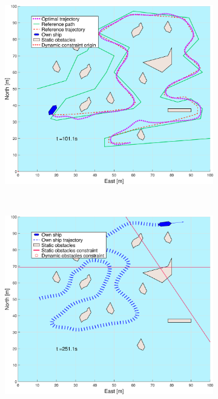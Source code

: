 \begin{figure}[!ht]
\begin{subfigure}[b]{0.494\textwidth}
        \subcaption{}
    \end{subfigure}
    \hfill
    \begin{subfigure}[b]{0.494\textwidth}
        \centering
        \includegraphics[width=\textwidth]{Images/Figures/skjergard_u_trafikk/_Simple_0fig999_time=101}
        \subcaption{}
    \end{subfigure}
    \hfill
    \\
    \begin{subfigure}[b]{0.494\textwidth}
        \centering
        \includegraphics[width=\textwidth]{Images/Figures/skjergard_u_trafikk/_Simple_0fig1_time=251}

\end{subfigure}
\end{figure}
